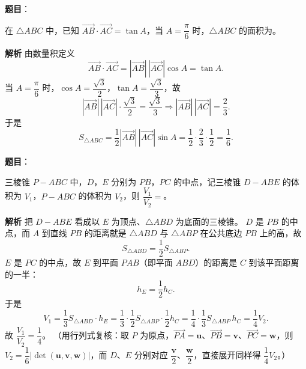 \begin{answer}

\textbf{题目}：

在 $\triangle ABC$ 中，已知 $\overrightarrow{AB}\cdot\overrightarrow{AC}=\tan A$，当 $A=\dfrac\pi6$ 时，$\triangle ABC$ 的面积为\gkblank{}。

\textbf{解析}
由数量积定义
\nopagebreak[4]
\[\overrightarrow{AB}\cdot\overrightarrow{AC}
=|\overrightarrow{AB}|\,|\overrightarrow{AC}|\cos A=\tan A .\]
当 $A=\dfrac\pi6$ 时，$\cos A=\dfrac{\sqrt3}2$，$\tan A=\dfrac{\sqrt3}3$，故
\nopagebreak[4]
\[|\overrightarrow{AB}|\,|\overrightarrow{AC}|\cdot\frac{\sqrt3}2=\frac{\sqrt3}3
\Longrightarrow|\overrightarrow{AB}|\,|\overrightarrow{AC}|=\frac23 .\]
于是
\nopagebreak[4]
\[S_{\triangle ABC}=\frac12|\overrightarrow{AB}|\,|\overrightarrow{AC}|\sin A
=\frac12\cdot\frac23\cdot\frac12=\frac16 .\]


\end{answer}
\begin{answer}

\textbf{题目}：

三棱锥 $P-ABC$ 中，$D$，$E$ 分别为 $PB$，$PC$ 的中点，记三棱锥 $D-ABE$ 的体积为 $V_1$，$P-ABC$ 的体积为 $V_2$，则 $\dfrac{V_1}{V_2}=$\gkblank{}。

\textbf{解析}
把 $D-ABE$ 看成以 $E$ 为顶点、$\triangle ABD$ 为底面的三棱锥。
$D$ 是 $PB$ 的中点，而 $A$ 到直线 $PB$ 的距离就是 $\triangle ABD$ 与 $\triangle ABP$ 在公共底边 $PB$ 上的高，故
\nopagebreak[4]
\[S_{\triangle ABD}=\frac12S_{\triangle ABP} .\]
$E$ 是 $PC$ 的中点，故 $E$ 到平面 $PAB$（即平面 $ABD$）的距离是 $C$ 到该平面距离的一半：
\nopagebreak[4]
\[h_E=\frac12h_C .\]
于是
\nopagebreak[4]
\[V_1=\frac13S_{\triangle ABD}\cdot h_E
=\frac13\cdot\frac12S_{\triangle ABP}\cdot\frac12h_C
=\frac14\cdot\frac13S_{\triangle ABP}\,h_C
=\frac14V_2 .\]
故 $\dfrac{V_1}{V_2}=\dfrac14$。
（用行列式复核：取 $P$ 为原点，$\overrightarrow{PA}=\boldsymbol u$、$\overrightarrow{PB}=\boldsymbol v$、$\overrightarrow{PC}=\boldsymbol w$，则 $V_2=\dfrac16|\det(\boldsymbol u,\boldsymbol v,\boldsymbol w)|$，而 $D$、$E$ 分别对应 $\dfrac{\boldsymbol v}2$、$\dfrac{\boldsymbol w}2$，直接展开同样得 $\dfrac14 V_2$。）


\end{answer}
